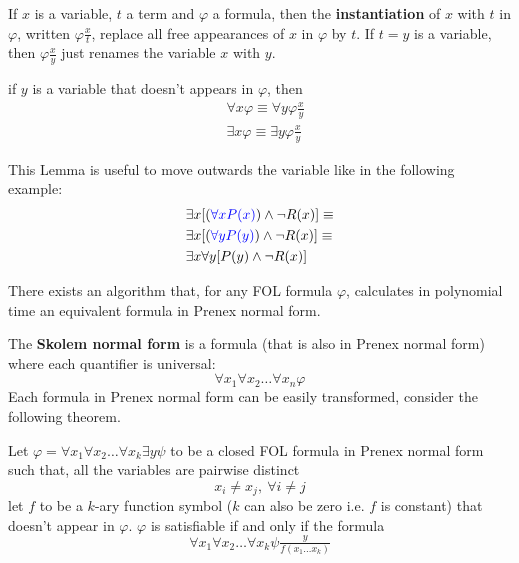 \documentclass[10pt, letterpaper]{report}
\begin{document}
\begin{definition}
    If $x$ is a variable, $t$ a term and $\varphi$ a formula, then the \textbf{instantiation} of $x$ with $t$ in $\varphi$, written $ \varphi\frac{x}{t}$, replace all free appearances of $x$ in $\varphi$ by $t$. If $t=y$ is a variable, then $\varphi\frac{x}{y}$ just renames the variable $x$ with $y$.
\end{definition}
\begin{lemma2}
    if $y$ is a variable that doesn't appears in $\varphi$, then\begin{align*}
        &\forall x \varphi\equiv \forall y \varphi\tfrac{x}{y}\\ 
        &\exists x \varphi\equiv \exists y \varphi\tfrac{x}{y}
    \end{align*}
\end{lemma2}
This Lemma is useful to move outwards the variable like in the following example:\begin{align*}
    &\exists x [ (\color{blue}\forall xP(x)\color{black})\land \lnot R(x) ]\equiv\\ 
     &\exists x [ (\color{blue}\forall yP(y)\color{black})\land \lnot R(x) ]\equiv\\
     &\exists x\forall y [ P(y)\land \lnot R(x) ]
\end{align*}
\begin{theorem}
    There exists an algorithm that, for any FOL formula $\varphi$, calculates in polynomial time an equivalent formula in Prenex normal form.
\end{theorem}
The \textbf{Skolem normal form} is a formula (that is also in Prenex normal form) where each quantifier is universal:\begin{equation}
    \forall x_1\forall x_2\dots\forall x_n\varphi
\end{equation}
Each formula in Prenex normal form can be easily transformed, consider the following theorem.\begin{theorem}[Skolem]
    Let $\varphi=\forall x_1\forall x_2\dots \forall x_k\exists y\psi$ to be a closed FOL formula in Prenex normal form such that, all the variables are pairwise distinct
    $$x_i\ne x_j, \ \forall i\ne j $$
    let $f$ to be a $k$-ary function symbol ($k$ can also be zero i.e. $f$ is constant) that doesn't appear in $\varphi$. $\varphi$ is satisfiable if and only if the formula\begin{equation}
       \forall x_1\forall x_2\dots \forall x_k\psi\tfrac{y}{f(x_1\dots x_k)}
    \end{equation}
\end{theorem}
\end{document}
